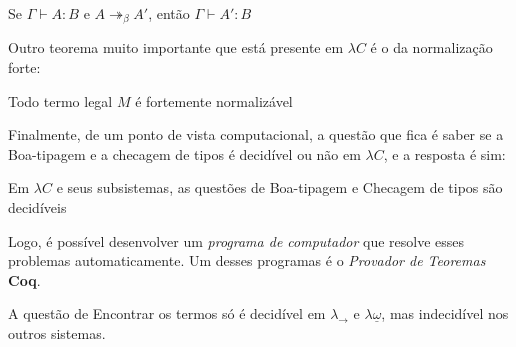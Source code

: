 \documentclass[../main.tex]{subfiles}
\begin{document}
\begin{lemma}
    Se $\Gamma \vdash A : B$ e $A \twoheadrightarrow_{\beta} A'$, então $\Gamma \vdash A' : B$
\end{lemma}

Outro teorema muito importante que está presente em $\lambda C$ é o da normalização forte:

\begin{theorem}
    Todo termo legal $M$ é fortemente normalizável
\end{theorem}

Finalmente, de um ponto de vista computacional, a questão que fica é saber se a Boa-tipagem e a checagem de tipos é decidível ou não em $\lambda C$, e a resposta é sim:

\begin{theorem}
    Em $\lambda C$ e seus subsistemas, as questões de Boa-tipagem e Checagem de tipos são decidíveis
\end{theorem}

Logo, é possível desenvolver um \emph{programa de computador} que resolve esses problemas automaticamente. Um desses programas é o \emph{Provador de Teoremas} \textbf{Coq}.

A questão de Encontrar os termos só é decidível em $\lambda_{\to}$ e $\lambda \underline{\omega}$, mas indecidível nos outros sistemas.
\end{document}
